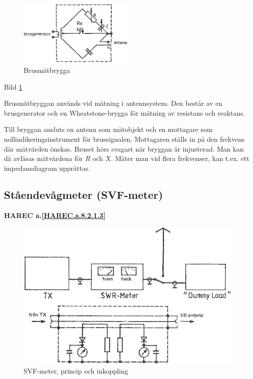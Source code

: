 \begin{figure}
  \includegraphics[width=0.5\textwidth]{images/cropped_pdfs/bild_2_8-08.pdf}
  \caption{Brusmätbrygga}
  \label{fig:bildII8-8}
\end{figure}

Bild \ref{fig:bildII8-8}

Brusmätbryggan används vid mätning i antennsystem. Den består av en
brusgenerator och en Wheatstone-brygga för mätning av resistans och
reaktans.

Till bryggan ansluts en antenn som mätobjekt och en mottagare som
nollindikeringsinstrument för brussignalen. Mottagaren ställs in på
den frekvens där mätvärden önskas. Bruset hörs svagast när bryggan är
injusterad. Man kan då avläsas mätvärdena för \(R\) och \(X\). Mäter
man vid flera frekvenser, kan t.ex. ett impedansdiagram upprättas.

\subsection{Ståendevågmeter (SVF-meter)}
\textbf{
HAREC a.\ref{HAREC.a.8.2.1.3}\label{myHAREC.a.8.2.1.3}
}

\begin{figure}
  \includegraphics[width=\textwidth]{images/cropped_pdfs/bild_2_8-09.pdf}
  \caption{SVF-meter, princip och inkoppling}
  \label{fig:bildII8-9}
\end{figure}

